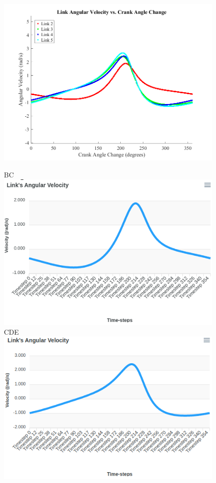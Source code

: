 \documentclass[12pt]{article}
\newcommand\hs{\hspace{1cm}}
\begin{document}
\begin{figure}[ht]
  \centering
  \includegraphics[scale=0.5]{../matlab-plots/angLinkVel.png}

  BC \includegraphics[scale=0.35]{../pmks-plots/angLinkVel/angLinkVelCB.png}%
  \hs CDE \includegraphics[scale=0.35]{../pmks-plots/angLinkVel/angLinkVelCDE.png}


\end{figure}
\end{document}
